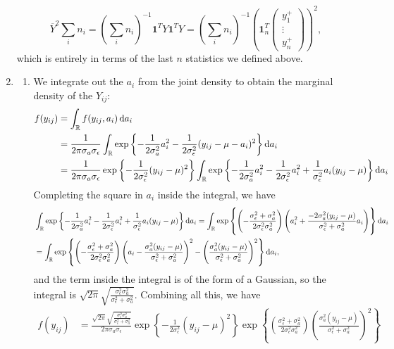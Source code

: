 \documentclass[11pt]{article}
\newcommand{\R}{\mathbb{R}}
\begin{document}
\begin{enumerate}
	\[
		\overline{Y}^2\sum_i n_i = (\sum_i n_i)^{-1}\bm{1}^TY\bm{1}^TY = (\sum_i n_i)^{-1}\left(\bm{1}_n^T\begin{pmatrix}
			y_1^+ \\ \vdots \\y_n^+
		\end{pmatrix}\right)^2,
	\]
	which is entirely in terms of the last $n$ statistics we defined above.
	\item 
		\begin{enumerate}
			\item We integrate out the $a_i$ from the joint density to obtain the marginal density of the $Y_{ij}$:
			\begin{align*}
				f(y_{ij}) &= \int_\R f(y_{ij},a_i) \dif a_i \\
				&= \frac{1}{2\pi \sigma_a\sigma_\epsilon}\int_\R\exp\left\{-\frac{1}{2\sigma_a^2}a_i^2 - \frac{1}{2\sigma_\epsilon^2} (y_{ij} - \mu - a_i)^2 \right\}\dif a_i \\
				&= \frac{1}{2\pi \sigma_a\sigma_\epsilon}\exp\left\{-\frac{1}{2\sigma_\epsilon^2}(y_{ij}-\mu)^2 \right\} \int_\R \exp\left\{-\frac{1}{2\sigma_a^2}a_i^2 - \frac{1}{2\sigma_\epsilon^2}a_i^2 + \frac{1}{\sigma_\epsilon^2}a_i(y_{ij}-\mu) \right\} \dif a_i
			\end{align*}
			Completing the square in $a_i$ inside the integral, we have
			\begin{align*}
				&\int_\R \exp\left\{-\frac{1}{2\sigma_a^2}a_i^2 - \frac{1}{2\sigma_\epsilon^2}a_i^2 + \frac{1}{\sigma_\epsilon^2}a_i(y_{ij}-\mu) \right\} \dif a_i = \int_\R \exp\left\{\left(-\frac{\sigma_\epsilon^2+\sigma_a^2}{2\sigma_\epsilon^2\sigma_a^2}\right)\left( a_i^2 + \frac{-2\sigma_a^2(y_{ij}-\mu)}{\sigma_\epsilon^2 + \sigma_a^2} a_i\right) \right\} \dif a_i \\
				&= \int_\R \exp\left\{\left(-\frac{\sigma_\epsilon^2+\sigma_a^2}{2\sigma_\epsilon^2\sigma_a^2}\right)\left( a_i - \frac{\sigma_a^2(y_{ij}-\mu)}{\sigma_\epsilon^2 + \sigma_a^2}\right)^2 - \left(\frac{\sigma_a^2(y_{ij}-\mu)}{\sigma_\epsilon^2 + \sigma_a^2}\right)^2\right\} \dif a_i,
			\end{align*}
			and the term inside the integral is of the form of a Gaussian, so the integral is $\sqrt{2\pi} \sqrt{\frac{\sigma_\epsilon^2\sigma_a^2}{\sigma_\epsilon^2 + \sigma_a^2}}$. Combining all this, we have
			\begin{align*}
				f(y_{ij}) &= \frac{\sqrt{2\pi} \sqrt{\frac{\sigma_\epsilon^2\sigma_a^2}{\sigma_\epsilon^2 + \sigma_a^2}}}{2\pi \sigma_a\sigma_\epsilon}\exp\left\{-\frac{1}{2\sigma_\epsilon^2}(y_{ij}-\mu)^2 \right\}\exp\left\{\left(\frac{\sigma_\epsilon^2+\sigma_a^2}{2\sigma_\epsilon^2\sigma_a^2}\right)\left(\frac{\sigma_a^2(y_{ij}-\mu)}{\sigma_\epsilon^2 + \sigma_a^2}\right)^2 \right\} \\

\end{align*}
\end{enumerate}
\end{enumerate}
\end{document}
